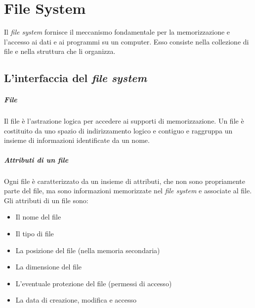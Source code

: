 \chapter{File System}

Il \textit{file system} fornisce il meccanismo fondamentale per la memorizzazione e l'accesso ai dati e ai programmi su un computer. Esso consiste nella collezione di file e nella struttura che li organizza. 

\section{L'interfaccia del \textit{file system}}
    \paragraph{File} Il file è l'astrazione logica per accedere ai supporti di memorizzazione. Un file è costituito da uno spazio di indirizzamento logico e contiguo e raggruppa un insieme di informazioni identificate da un nome.
    \paragraph{Attributi di un file} Ogni file è caratterizzato da un insieme di attributi, che non sono propriamente parte del file, ma sono informazioni memorizzate nel \textit{file system} e associate al file. Gli attributi di un file sono:
    \begin{itemize}
        \item Il nome del file
        \item Il tipo di file
        \item La posizione del file (nella memoria secondaria)
        \item La dimensione del file 
        \item L'eventuale protezione del file (permessi di accesso)
        \item La data di creazione, modifica e accesso
    \end{itemize}
